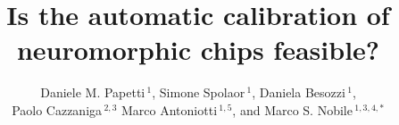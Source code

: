 \documentclass[utf8]{frontiersFPHY} %
\def\firstAuthorLast{Papetti {et~al.}} %
\def\Authors{Daniele M. Papetti\,$^{1}$, Simone Spolaor\,$^{1}$, Daniela Besozzi\,$^{1}$,\\Paolo Cazzaniga\,$^{2,3}$  Marco Antoniotti\,$^{1,5}$, and Marco S. Nobile\,$^{1,3,4,*}$}
\begin{document}
\onecolumn
{}

\title[]{Is the automatic calibration of neuromorphic chips feasible?} 

\author[\firstAuthorLast ]{\Authors} %
\address{} %
\correspondance{} %

\extraAuth{}%


\maketitle
\end{document}
